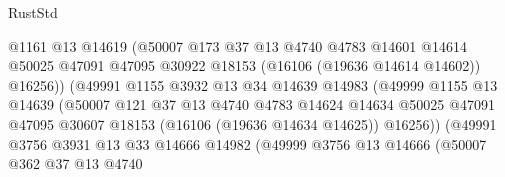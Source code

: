 \begin{lexlean}{RustStd}
\begin{coremodule}
                                  @1161
                                  @13
                                  @14619
                                  (@50007
                                    @173
                                    @37
                                    @13
                                    @4740
                                    @4783
                                    @14601
                                    @14614
                                    @50025
                                    @47091
                                    @47095
                                    @30922
                                    @18153
                                    (@16106 (@19636 @14614 @14602))
                                    @16256))
                                (@49991
                                  @1155
                                  @3932
                                  @13
                                  @34
                                  @14639
                                  @14983
                                  (@49999
                                    @1155
                                    @13
                                    @14639
                                    (@50007
                                      @121
                                      @37
                                      @13
                                      @4740
                                      @4783
                                      @14624
                                      @14634
                                      @50025
                                      @47091
                                      @47095
                                      @30607
                                      @18153
                                      (@16106 (@19636 @14634 @14625))
                                      @16256))
                                  (@49991
                                    @3756
                                    @3931
                                    @13
                                    @33
                                    @14666
                                    @14982
                                    (@49999
                                      @3756
                                      @13
                                      @14666
                                      (@50007
                                        @362
                                        @37
                                        @13
                                        @4740

\end{coremodule}
\end{lexlean}
